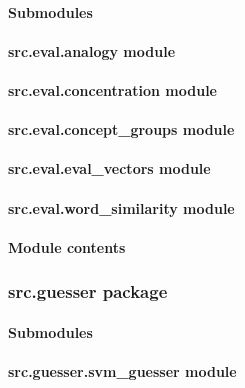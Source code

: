 \documentclass[letterpaper,10pt,english]{sphinxmanual}
\begin{document}
\paragraph{Submodules}
\label{src.eval:submodules}

\paragraph{src.eval.analogy module}
\label{src.eval:src-eval-analogy-module}

\paragraph{src.eval.concentration module}
\label{src.eval:src-eval-concentration-module}

\paragraph{src.eval.concept\_groups module}
\label{src.eval:src-eval-concept-groups-module}

\paragraph{src.eval.eval\_vectors module}
\label{src.eval:src-eval-eval-vectors-module}

\paragraph{src.eval.word\_similarity module}
\label{src.eval:src-eval-word-similarity-module}

\paragraph{Module contents}
\label{src.eval:module-src.eval}\label{src.eval:module-contents}

\subsubsection{src.guesser package}
\label{src.guesser::doc}\label{src.guesser:src-guesser-package}

\paragraph{Submodules}
\label{src.guesser:submodules}

\paragraph{src.guesser.svm\_guesser module}
\label{src.guesser:src-guesser-svm-guesser-module}
\end{document}
